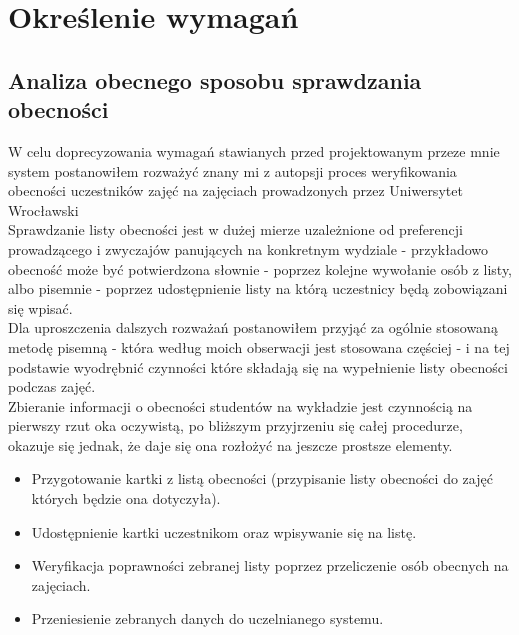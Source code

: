 \documentclass[declaration,shortabstract, mgr]{iithesis}
\begin{document}
\chapter{Określenie wymagań}
\section{Analiza obecnego sposobu sprawdzania obecności}
W celu doprecyzowania wymagań stawianych przed projektowanym przeze mnie system postanowiłem rozważyć znany mi z autopsji proces weryfikowania obecności uczestników zajęć na zajęciach prowadzonych przez Uniwersytet Wrocławski\\
\indent Sprawdzanie listy obecności jest w dużej mierze uzależnione od preferencji prowadzącego i zwyczajów panujących na konkretnym wydziale - przykładowo obecność może być potwierdzona słownie - poprzez kolejne wywołanie osób z listy, albo pisemnie - poprzez udostępnienie listy na którą uczestnicy będą zobowiązani się wpisać.\\
\indent Dla uproszczenia dalszych rozważań postanowiłem przyjąć za ogólnie stosowaną metodę pisemną - która według moich obserwacji jest stosowana częściej - i na tej podstawie wyodrębnić czynności które składają się na wypełnienie listy obecności podczas zajęć.\\
\indent Zbieranie informacji o obecności studentów na wykładzie jest czynnością na pierwszy rzut oka oczywistą, po bliższym przyjrzeniu się całej procedurze, okazuje się jednak, że daje się ona rozłożyć na jeszcze prostsze elementy. \\

\begin{itemize}
\item Przygotowanie kartki z listą obecności (przypisanie listy obecności do zajęć których będzie ona dotyczyła).
\item Udostępnienie kartki uczestnikom oraz wpisywanie się na listę.
\item Weryfikacja poprawności zebranej listy poprzez przeliczenie osób obecnych na zajęciach.
\item Przeniesienie zebranych danych do uczelnianego systemu.
\end{itemize}
\end{document}
